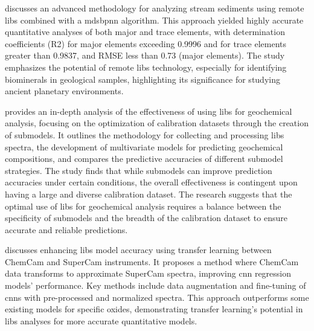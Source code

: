 \citet{wangDeterminationElementalComposition2023} discusses an advanced methodology for analyzing stream sediments using remote \gls{libs} combined with a \gls{mdsbpnn} algorithm.
This approach yielded highly accurate quantitative analyses of both major and trace elements, with determination coefficients (R2) for major elements exceeding 0.9996 and for trace elements greater than 0.9837, and RMSE less than 0.73 (major elements).
The study emphasizes the potential of remote \gls{libs} technology, especially for identifying biominerals in geological samples, highlighting its significance for studying ancient planetary environments.

\citet{leporeQuantitativePredictionAccuracies2022a} provides an in-depth analysis of the effectiveness of using \gls{libs} for geochemical analysis, focusing on the optimization of calibration datasets through the creation of submodels.
It outlines the methodology for collecting and processing \gls{libs} spectra, the development of multivariate models for predicting geochemical compositions, and compares the predictive accuracies of different submodel strategies.
The study finds that while submodels can improve prediction accuracies under certain conditions, the overall effectiveness is contingent upon having a large and diverse calibration dataset.
The research suggests that the optimal use of \gls{libs} for geochemical analysis requires a balance between the specificity of submodels and the breadth of the calibration dataset to ensure accurate and reliable predictions.

\citet{kepesImprovingLaserinducedBreakdown2022} discusses enhancing \gls{libs} model accuracy using transfer learning between ChemCam and SuperCam instruments.
It proposes a method where ChemCam data transforms to approximate SuperCam spectra, improving \gls{cnn} regression models' performance.
Key methods include data augmentation and fine-tuning of \gls{cnn}s with pre-processed and normalized spectra.
This approach outperforms some existing models for specific oxides, demonstrating transfer learning's potential in \gls{libs} analyses for more accurate quantitative models.

